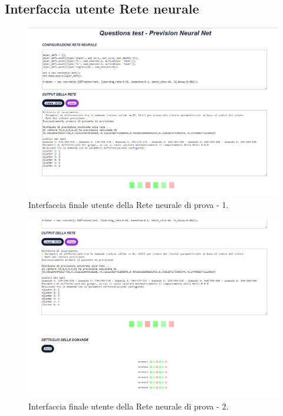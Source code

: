 \subsection{Interfaccia utente Rete neurale}
\label{Interfaccia utente Rete neurale}



\begin{figure}[H]
\centering
	\includegraphics[width=1\linewidth]{./image/Rete-di-prova_finale.png}
	\caption{Interfaccia finale utente della Rete neurale di prova - 1.}
	\label{Interfaccia finale utente della Rete neurale di prova -1.}
\end{figure}
\noindent

\begin{figure}[H]
\centering
	\includegraphics[width=1\linewidth]{./image/Rete-di-prova_finale2.png}
	\caption{Interfaccia finale utente della Rete neurale di prova - 2.}
	\label{Interfaccia finale utente della Rete neurale di prova - 2.}
\end{figure}
\noindent

